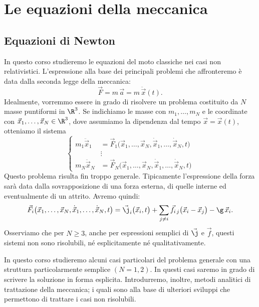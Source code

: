 %
%
\chapter{Le equazioni della meccanica}
\section{Equazioni di Newton}

In questo corso studieremo le equazioni del moto classiche nei casi non relativistici.
L'espressione alla base dei principali problemi che affronteremo è data dalla seconda legge della meccanica:
\[
	\vec{F} = m\,\vec{a} = m\,\ddot{\vec{x}}(t).
\]
Idealmente, vorremmo essere in grado di risolvere un problema costituito da \(N\) masse puntiformi in \(\R^3\).
Se indichiamo le masse con \(m_1, \ldots, m_N\) e le coordinate con \(\vec{x}_1, \ldots, \vec{x}_N\in\R^3\), dove assumiamo la dipendenza dal tempo \(\vec{x}=\vec{x}(t)\), otteniamo il sistema
\[
	\left\{\begin{aligned}
		m_1 \ddot{\vec{x}}_1 & = \vec{F}_1\big(\vec{x}_1,\ldots,\vec{x}_N, \dot{\vec{x}}_1, \ldots, \dot{\vec{x}}_N, t\big) \\
		                     & \vdots                                                                                       \\
		m_N \ddot{\vec{x}}_N & = \vec{F}_N\big(\vec{x}_1,\ldots,\vec{x}_N, \dot{\vec{x}}_1, \ldots, \dot{\vec{x}}_N, t\big)
	\end{aligned}\right.
\]
Questo problema risulta fin troppo generale. Tipicamente l'espressione della forza sarà data dalla sovrapposizione di una forza esterna, di quelle interne ed eventualmente di un attrito.
Avremo quindi:
\[
	\vec{F}_i\big(\vec{x}_1,\ldots,\vec{x}_N, \dot{\vec{x}}_1, \ldots, \dot{\vec{x}}_N, t\big) = \vec{\j}_i\big(\vec{x}_i,t\big) + \sum_{j\neq i} \vec{f}_{i\,j}\big(\vec{x}_i - \vec{x}_j\big) - \g\,\vec{x}_i.
\]
Osserviamo che per \(N\ge 3\), anche per espressioni semplici di \(\vec{\j}\) e \(\vec{f}\), questi sistemi non sono risolubili, né esplicitamente né qualitativamente.

In questo corso studieremo alcuni casi particolari del problema generale con una struttura particolarmente semplice \((N=1,2)\). In questi casi saremo in grado di scrivere la soluzione in forma esplicita.
Introdurremo, inoltre, metodi analitici di trattazione della meccanica; i quali sono alla base di ulteriori sviluppi che permettono di trattare i casi non risolubili.

